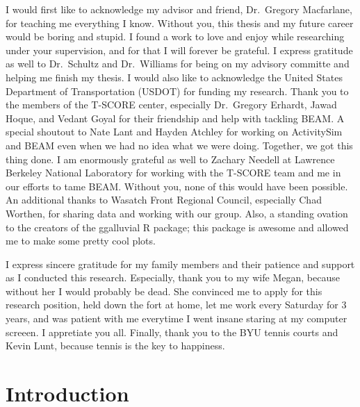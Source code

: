 \documentclass[fancy, masters]{byuthesis}
\begin{document}
    \begin{acknowledgments}
  I would first like to acknowledge my advisor and friend, Dr.~Gregory Macfarlane, for teaching me everything I know. Without you, this thesis and my future career would be boring and stupid. I found a work to love and enjoy while researching under your supervision, and for that I will forever be grateful. I express gratitude as well to Dr.~Schultz and Dr.~Williams for being on my advisory committe and helping me finish my thesis. I would also like to acknowledge the United States Department of Transportation (USDOT) for funding my research. Thank you to the members of the T-SCORE center, especially Dr.~Gregory Erhardt, Jawad Hoque, and Vedant Goyal for their friendship and help with tackling BEAM. A special shoutout to Nate Lant and Hayden Atchley for working on ActivitySim and BEAM even when we had no idea what we were doing. Together, we got this thing done. I am enormously grateful as well to Zachary Needell at Lawrence Berkeley National Laboratory for working with the T-SCORE team and me in our efforts to tame BEAM. Without you, none of this would have been possible. An additional thanks to Wasatch Front Regional Council, especially Chad Worthen, for sharing data and working with our group. Also, a standing ovation to the creators of the ggalluvial R package; this package is awesome and allowed me to make some pretty cool plots.

  I express sincere gratitude for my family members and their patience and support as I conducted this research. Especially, thank you to my wife Megan, because without her I would probably be dead. She convinced me to apply for this research position, held down the fort at home, let me work every Saturday for 3 years, and was patient with me everytime I went insane staring at my computer screeen. I appretiate you all. Finally, thank you to the BYU tennis courts and Kevin Lunt, because tennis is the key to happiness.
  \end{acknowledgments}
  	\clearpage

	\tableofcontents*
	\clearpage

	\listoffigures
	\clearpage

	\listoftables
	\clearpage

	
	\clearpage

	\mainmatter

\hypertarget{intro}{%
\chapter{Introduction}\label{intro}}
\end{document}
